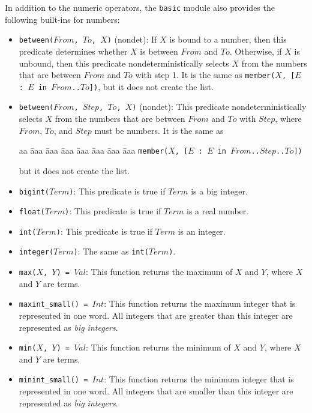 In addition to the numeric operators, the \texttt{basic} module also provides the following built-ins for numbers:

\begin{itemize}
\item \texttt{between($From$, $To$, $X$)} (nondet): If $X$ is bound to a number, then this predicate determines whether $X$ is between $From$ and $To$.  Otherwise, if $X$ is unbound, then this predicate nondeterministically selects $X$ from the numbers that are between $From$ and $To$ with step 1. It is the same as \texttt{member($X$, [$E$ : $E$ in $From$..$To$])}, but it does not create the list.
\item \texttt{between($From$, $Step$, $To$, $X$)} (nondet): This predicate nondeterministically selects $X$ from the numbers that are between $From$ and $To$ with $Step$, where $From$, $To$, and $Step$ must be numbers. It is the same as
\begin{tabbing}
aa \= aaa \= aaa \= aaa \=aaa \= aaa \= aaa \= aaa \kill
\> \texttt{member($X$, [$E$ : $E$ in $From$..$Step$..$To$])}
\end{tabbing}
but it does not create the list.
\item \texttt{bigint($Term$)}: This predicate is true if $Term$ is a big integer.
\item \texttt{float($Term$)}: This predicate is true if $Term$ is a real number.
\item \texttt{int($Term$)}: This predicate is true if $Term$ is an integer.
\item \texttt{integer($Term$)}: The same as \texttt{int($Term$)}.
\item \texttt{max($X$, $Y$) = $Val$}: This function returns the maximum of $X$ and $Y$, where $X$ and $Y$ are terms.
\item \texttt{maxint\_small() = $Int$}: This function returns the maximum integer that is represented in one word. All integers that are greater than this integer are represented as \textit{big integers}.
\item \texttt{min($X$, $Y$) = $Val$}: This function returns the minimum of $X$ and $Y$, where $X$ and $Y$ are terms.
\item \texttt{minint\_small() = $Int$}: This function returns the minimum integer that is represented in one word. All integers that are smaller than this integer are represented as \textit{big integers}.

\end{itemize}
